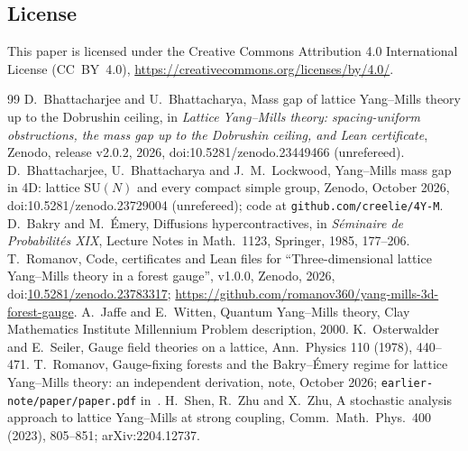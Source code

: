 \documentclass[11pt]{amsart}
\theoremstyle{definition}
\theoremstyle{remark}
\newcommand{\SU}{\mathrm{SU}}
\begin{document}
\subsection*{License}
This paper is licensed under the Creative Commons Attribution 4.0 International License (CC~BY~4.0),
\url{https://creativecommons.org/licenses/by/4.0/}.

\begin{thebibliography}{99}
 D.~Bhattacharjee and U.~Bhattacharya, Mass gap of lattice Yang--Mills theory up to the Dobrushin
ceiling, in \emph{Lattice Yang--Mills theory: spacing-uniform obstructions, the mass gap up to the Dobrushin ceiling,
and Lean certificate}, Zenodo, release v2.0.2, 2026, doi:10.5281/zenodo.23449466 (unrefereed).
 D.~Bhattacharjee, U.~Bhattacharya and J.~M.~Lockwood, Yang--Mills mass gap in 4D: lattice $\SU(N)$ and every
compact simple group, Zenodo, October 2026, doi:10.5281/zenodo.23729004 (unrefereed); code at
\texttt{github.com/creelie/4Y-M}.
 D.~Bakry and M.~\'Emery, Diffusions hypercontractives, in \emph{S\'eminaire de Probabilit\'es XIX},
Lecture Notes in Math.\ 1123, Springer, 1985, 177--206.
 T.~Romanov, Code, certificates and Lean files for ``Three-dimensional lattice Yang--Mills theory in a
forest gauge'', v1.0.0, Zenodo, 2026, doi:\href{https://doi.org/10.5281/zenodo.23783317}{10.5281/zenodo.23783317};
\url{https://github.com/romanov360/yang-mills-3d-forest-gauge}.
 A.~Jaffe and E.~Witten, Quantum Yang--Mills theory, Clay Mathematics Institute Millennium Problem
description, 2000.
 K.~Osterwalder and E.~Seiler, Gauge field theories on a lattice, Ann.\ Physics 110 (1978), 440--471.
 T.~Romanov, Gauge-fixing forests and the Bakry--\'Emery regime for lattice Yang--Mills theory: an
independent derivation, note, October 2026; \texttt{earlier-note/paper/paper.pdf} in~\cite{code}.
 H.~Shen, R.~Zhu and X.~Zhu, A stochastic analysis approach to lattice Yang--Mills at strong coupling,
Comm.\ Math.\ Phys.\ 400 (2023), 805--851; arXiv:2204.12737.
\end{thebibliography}
\end{document}
